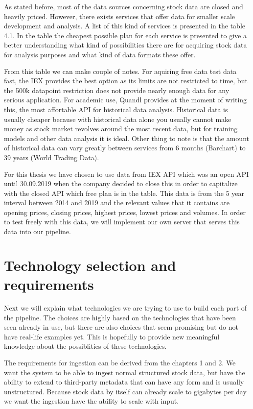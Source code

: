 As stated before, most of the data sources concerning stock data are closed and heavily priced.
However, there exists services that offer data for smaller scale development and analysis.
A list of this kind of services is presented in the table 4.1.
In the table the cheapest possible plan for each service is presented to give a better understanding what kind of possibilities there are for acquiring stock data for analysis purposes and what kind of data formats these offer.

From this table we can make couple of notes.
For aquiring free data test data fast, the IEX provides the best option as its limits are not restricted to time, but the 500k datapoint restriction does not provide nearly enough data for any serious application.
For academic use, Quandl provides at the moment of writing this, the most affortable API for historical data analysis.
Historical data is usually cheaper because with historical data alone you usually cannot make money as stock market revolves around the most recent data, but for training models and other data analysis it is ideal.
Other thing to note is that the amount of historical data can vary greatly between services from 6 months (Barchart) to 39 years (World Trading Data).

For this thesis we have chosen to use data from IEX API which was an open API until 30.09.2019 when the company decided to close this in order to capitalize with the closed API which free plan is in the table.
This data is from the 5 year interval between 2014 and 2019 and the relevant values that it contains are opening prices, closing prices, highest prices, lowest prices and volumes.
In order to test freely with this data, we will implement our own server that serves this data into our pipeline.

\section{Technology selection and requirements}

Next we will explain what technologies we are trying to use to build each part of the pipeline.
The choices are highly based on the technologies that have been seen already in use, but there are also choices that seem promising but do not have real-life examples yet.
This is hopefully to provide new meaningful knowledge about the possiblities of these technologies.

The requirements for ingestion can be derived from the chapters 1 and 2.
We want the system to be able to ingest normal structured stock data, but have the ability to extend to third-party metadata that can have any form and is usually unstructured.
Because stock data by itself can already scale to gigabytes per day we want the ingestion have the ability to scale with input.

